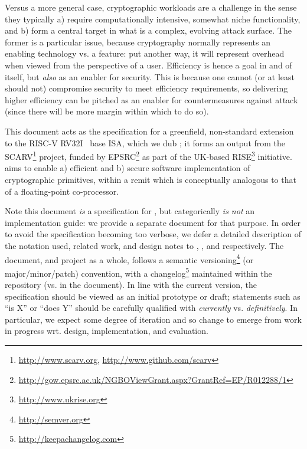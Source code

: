 
Versus a more general case, cryptographic workloads are a challenge in the
sense they typically
a) require computationally intensive, somewhat niche functionality,
   and
b) form a central target in what is a complex, evolving attack surface.
The former is a particular issue, because cryptography normally represents
an enabling technology vs. a feature: put another way, it will represent
overhead when viewed from the perspective of a user.  Efficiency is hence 
a goal in and of itself, but {\em also} as an enabler for security.  This 
is because one cannot (or at least should not) compromise security to meet 
efficiency requirements, so delivering higher efficiency can be pitched as 
an enabler for countermeasures against attack (since there will be more 
margin within which to do so).

This document acts as the specification for a 
greenfield, non-standard extension~\cite[Section 21.1]{SCARV:RV:ISA:I:17} 
to the RISC-V 
RV32I~\cite[Section 2]{SCARV:RV:ISA:I:17}
base ISA, which we dub \XCID; it forms an output from the SCARV\footnote{
\url{http://www.scarv.org}, \url{http://www.github.com/scarv}
} project, funded by EPSRC\footnote{
\url{http://gow.epsrc.ac.uk/NGBOViewGrant.aspx?GrantRef=EP/R012288/1}
} as part of the UK-based RISE\footnote{
\url{http://www.ukrise.org}
} initiative.  
\XCID aims to enable
a) efficient
   and
b) secure
software implementation of cryptographic primitives, within a remit which
is conceptually analogous to that of a floating-point co-processor.

Note this document {\em is} a specification for \XCID, but categorically
{\em is not} an implementation guide: we provide a separate document for 
that purpose.  In order to avoid the specification becoming too verbose,
we defer a detailed description of the notation used, related work, and 
design notes to
,
,
and
respectively.  The document, and project as a whole, follows a semantic 
versioning\footnote{
\url{http://semver.org}
} (or major/minor/patch) convention, with a changelog\footnote{
\url{http://keepachangelog.com}
} maintained within the repository (vs. in the document).
In line with the current version, the specification should be viewed as an
initial prototype or draft; statements such as 
``\XCID is   X'' 
or
``\XCID does Y''
should be carefully qualified with {\em currently} vs. {\em definitively}.  
In particular, we expect some degree of iteration and so change to emerge 
from work in progress wrt. design, implementation, and evaluation.

